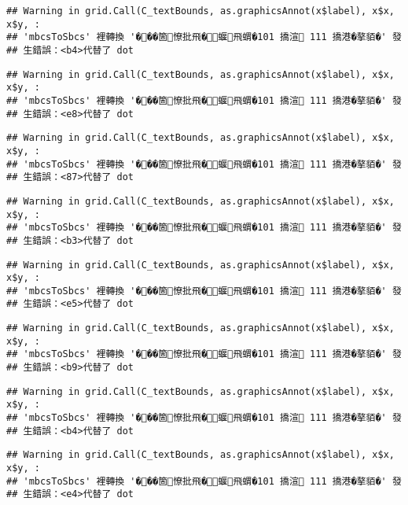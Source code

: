 \documentclass[
]{article}
\begin{document}
\begin{verbatim}
## Warning in grid.Call(C_textBounds, as.graphicsAnnot(x$label), x$x, x$y, :
## 'mbcsToSbcs' 裡轉換 '���箇憭批飛�蝘飛蝟�101 撟渲 111 撟港�摮貊�' 發
## 生錯誤：<b4>代替了 dot
\end{verbatim}

\begin{verbatim}
## Warning in grid.Call(C_textBounds, as.graphicsAnnot(x$label), x$x, x$y, :
## 'mbcsToSbcs' 裡轉換 '���箇憭批飛�蝘飛蝟�101 撟渲 111 撟港�摮貊�' 發
## 生錯誤：<e8>代替了 dot
\end{verbatim}

\begin{verbatim}
## Warning in grid.Call(C_textBounds, as.graphicsAnnot(x$label), x$x, x$y, :
## 'mbcsToSbcs' 裡轉換 '���箇憭批飛�蝘飛蝟�101 撟渲 111 撟港�摮貊�' 發
## 生錯誤：<87>代替了 dot
\end{verbatim}

\begin{verbatim}
## Warning in grid.Call(C_textBounds, as.graphicsAnnot(x$label), x$x, x$y, :
## 'mbcsToSbcs' 裡轉換 '���箇憭批飛�蝘飛蝟�101 撟渲 111 撟港�摮貊�' 發
## 生錯誤：<b3>代替了 dot
\end{verbatim}

\begin{verbatim}
## Warning in grid.Call(C_textBounds, as.graphicsAnnot(x$label), x$x, x$y, :
## 'mbcsToSbcs' 裡轉換 '���箇憭批飛�蝘飛蝟�101 撟渲 111 撟港�摮貊�' 發
## 生錯誤：<e5>代替了 dot
\end{verbatim}

\begin{verbatim}
## Warning in grid.Call(C_textBounds, as.graphicsAnnot(x$label), x$x, x$y, :
## 'mbcsToSbcs' 裡轉換 '���箇憭批飛�蝘飛蝟�101 撟渲 111 撟港�摮貊�' 發
## 生錯誤：<b9>代替了 dot
\end{verbatim}

\begin{verbatim}
## Warning in grid.Call(C_textBounds, as.graphicsAnnot(x$label), x$x, x$y, :
## 'mbcsToSbcs' 裡轉換 '���箇憭批飛�蝘飛蝟�101 撟渲 111 撟港�摮貊�' 發
## 生錯誤：<b4>代替了 dot
\end{verbatim}

\begin{verbatim}
## Warning in grid.Call(C_textBounds, as.graphicsAnnot(x$label), x$x, x$y, :
## 'mbcsToSbcs' 裡轉換 '���箇憭批飛�蝘飛蝟�101 撟渲 111 撟港�摮貊�' 發
## 生錯誤：<e4>代替了 dot
\end{verbatim}
\end{document}
